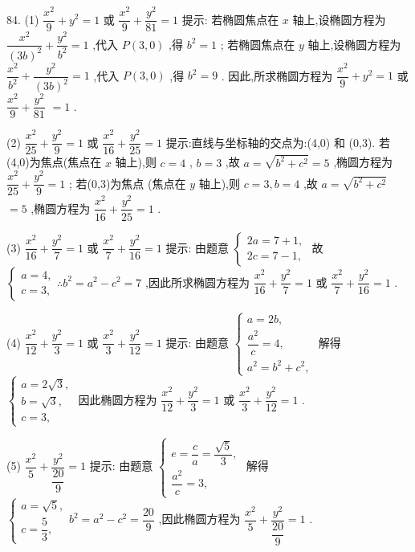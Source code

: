 84. (1) $\dfrac{{x}^{2}}{9} + {y}^{2} = 1$ 或 $\dfrac{{x}^{2}}{9} + \dfrac{{y}^{2}}{81} = 1$ 提示: 若椭圆焦点在 $x$ 轴上,设椭圆方程为 $\dfrac{{x}^{2}}{{\left( 3b\right) }^{2}} + \dfrac{{y}^{2}}{{b}^{2}} = 1$ ,代入 $P\left( {3,0}\right)$ ,得 ${b}^{2} = 1$ ; 若椭圆焦点在 $y$ 轴上,设椭圆方程为 $\dfrac{{x}^{2}}{{b}^{2}} + \dfrac{{y}^{2}}{{\left( 3b\right) }^{2}} = 1$ ,代入 $P\left( {3,0}\right)$ ,得 ${b}^{2} = 9$ . 因此,所求椭圆方程为 $\dfrac{{x}^{2}}{9} + {y}^{2} = 1$ 或 $\dfrac{{x}^{2}}{9} + \dfrac{{y}^{2}}{81}$  $= 1$ .

(2) $\dfrac{{x}^{2}}{25} + \dfrac{{y}^{2}}{9} = 1$ 或 $\dfrac{{x}^{2}}{16} + \dfrac{{y}^{2}}{25} = 1$ 提示:直线与坐标轴的交点为:(4,0) 和 (0,3). 若(4,0)为焦点(焦点在 $x$ 轴上),则 $c = 4$ , $b = 3$ ,故 $a = \sqrt{{b}^{2} + {c}^{2}} = 5$ ,椭圆方程为 $\dfrac{{x}^{2}}{25} + \dfrac{{y}^{2}}{9} = 1$ ; 若(0,3)为焦点 (焦点在 $y$ 轴上),则 $c = 3,b = 4$ ,故 $a = \sqrt{{b}^{2} + {c}^{2}}$  $= 5$ ,椭圆方程为 $\dfrac{{x}^{2}}{16} + \dfrac{{y}^{2}}{25} = 1$ .

(3) $\dfrac{{x}^{2}}{16} + \dfrac{{y}^{2}}{7} = 1$ 或 $\dfrac{{x}^{2}}{7} + \dfrac{{y}^{2}}{16} = 1$ 提示: 由题意 $\left\{  \begin{array}{l} {2a} = 7 + 1, \\  {2c} = 7 - 1, \end{array}\right.$ 故 $\left\{  \begin{array}{l} a = 4, \\  c = 3, \end{array}\right. \therefore {b}^{2} = {a}^{2} - {c}^{2} = 7$ ,因此所求椭圆方程为 $\dfrac{{x}^{2}}{16} + \dfrac{{y}^{2}}{7} = 1$ 或 $\dfrac{{x}^{2}}{7} + \dfrac{{y}^{2}}{16} = 1$ .

(4) $\dfrac{{x}^{2}}{12} + \dfrac{{y}^{2}}{3} = 1$ 或 $\dfrac{{x}^{2}}{3} + \dfrac{{y}^{2}}{12} = 1$ 提示: 由题意 $\left\{  \begin{array}{l} a = {2b}, \\  \dfrac{{a}^{2}}{c} = 4, \\  {a}^{2} = {b}^{2} + {c}^{2}, \end{array}\right.$ 解得 $\left\{  \begin{array}{l} a = 2\sqrt{3}, \\  b = \sqrt{3}, \\  c = 3, \end{array}\right.$ 因此椭圆方程为 $\dfrac{{x}^{2}}{12} + \dfrac{{y}^{2}}{3} = 1$ 或 $\dfrac{{x}^{2}}{3} + \dfrac{{y}^{2}}{12} = 1$ .

(5) $\dfrac{{x}^{2}}{5} + \dfrac{{y}^{2}}{\dfrac{20}{9}} = 1$ 提示: 由题意 $\left\{  \begin{array}{l} e = \dfrac{c}{a} = \dfrac{\sqrt{5}}{3}, \\  \dfrac{{a}^{2}}{c} = 3, \end{array}\right.$ 解得 $\left\{  \begin{array}{l} a = \sqrt{5}, \\  c = \dfrac{5}{3}, \end{array}\right. {b}^{2} = {a}^{2} - {c}^{2} = \dfrac{20}{9}$ ,因此椭圆方程为 $\dfrac{{x}^{2}}{5} + \dfrac{{y}^{2}}{\dfrac{20}{9}} = 1$ .

